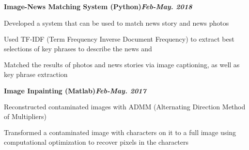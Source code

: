 \bf  Image-News Matching System (Python)\hfill{\it Feb-May. 2018}\rm\\
\vspace{-4mm}
\begin{list2}
\item Developed a system that can be used to match news story and news photos
\item Used TF-IDF (Term Frequency Inverse Document Frequency) to extract best selections of key phrases to describe the news and
\item Matched the results of photos and news stories via image captioning, as well as key phrase extraction  
\end{list2}


\bf Image Inpainting (Matlab)\hfill{\it Feb-May. 2017}\rm\\
\vspace{-4mm}
\begin{list2}
\item Reconstructed contaminated images with ADMM (Alternating Direction 
Method of Multipliers) 
\item Transformed a contaminated image with characters on it to a full image using computational optimization to recover pixels in the characters\\
\end{list2}


